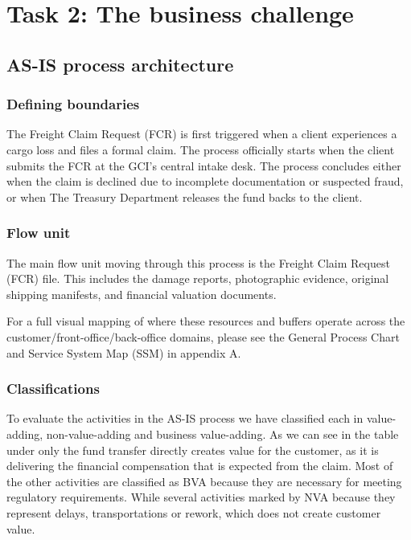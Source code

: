 \newpage

\section{Task 2: The business challenge}
\subsection{AS-IS process architecture}

\subsubsection{Defining boundaries}

The Freight Claim Request (FCR) is first triggered when a client experiences a cargo loss and files a formal claim. The process officially starts when the client submits the FCR at the GCI’s central intake desk. The process concludes either when the claim is declined due to incomplete documentation or suspected fraud, or when The Treasury Department releases the fund backs to the client. 

\subsubsection{Flow unit}

The main flow unit moving through this process is the Freight Claim Request (FCR) file. This includes the damage reports, photographic evidence, original shipping manifests, and financial valuation documents.



For a full visual mapping of where these resources and buffers operate across the customer/front-office/back-office domains, please see the General Process Chart and Service System Map (SSM) in appendix A. 

\subsubsection{Classifications}

To evaluate the activities in the AS-IS process we have classified each in value-adding, non-value-adding and business value-adding. As we can see in the table under only the fund transfer directly creates value for the customer, as it is delivering the financial compensation that is expected from the claim. Most of the other activities are classified as BVA because they are necessary for meeting regulatory requirements. While several activities marked by NVA because they represent delays, transportations or rework, which does not create customer value. 

